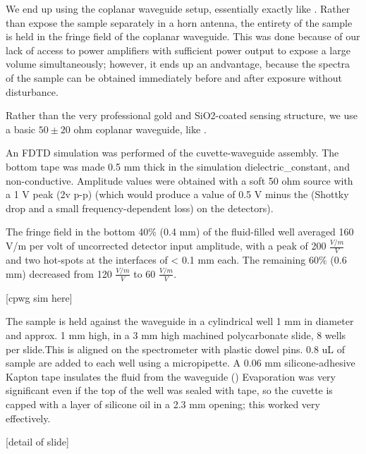 \documentclass[paper.tex]{subfiles}
\begin{document}
We end up using the coplanar waveguide setup, essentially exactly like \cite{Efficient2015}. Rather than expose the sample separately in a horn antenna, the entirety of the sample is held in the fringe field of the coplanar waveguide.
This was done because of our lack of access to power amplifiers with sufficient power output to expose a large volume simultaneously; however, it ends up an andvantage, because the spectra of the sample can be obtained immediately before and after exposure without disturbance.

Rather than the very professional gold and SiO2-coated sensing structure, we use a basic $50\pm20$ ohm coplanar waveguide, like \cite{Sun}.

An FDTD simulation was performed of the cuvette-waveguide assembly\footnotemark. The bottom tape was made 0.5 mm thick in the simulation dielectric\_constant, and non-conductive\footnotemark. Amplitude values were obtained with a soft 50 ohm source with a 1 V peak (2v p-p) (which would produce a value of 0.5 V minus the (Shottky drop and a small frequency-dependent loss) on the detectors).

The fringe field in the bottom 40\% (0.4 mm) of the fluid-filled well averaged 160 V/m per volt of uncorrected detector input amplitude, with a peak of 200 $\frac{V/m}{V}$ and two hot-spots at the interfaces of < 0.1 mm each. The remaining 60\% (0.6 mm) decreased from 120 $\frac{V/m}{V}$ to 60 $\frac{V/m}{V}$.



[cpwg sim here]


The sample is held against the waveguide in a cylindrical well 1 mm in diameter and approx. 1 mm high, in a 3 mm high machined polycarbonate slide, 8 wells per slide.\footnotemark This is aligned on the spectrometer with plastic dowel pins. 0.8 uL of sample are added to each well using a micropipette. A 0.06 mm silicone-adhesive Kapton tape insulates the fluid from the waveguide ()
Evaporation was very significant even if the top of the well was sealed with tape, so the cuvette is capped with a layer of silicone oil in a 2.3 mm opening; this worked very effectively.

[detail of slide]

\end{document}
